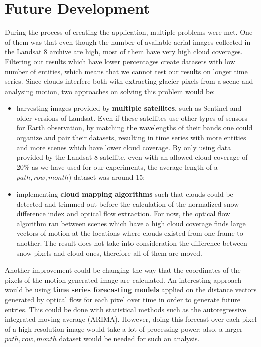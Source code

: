 \documentclass[12pt, a4paper]{report}
\begin{document}
	\section{Future Development}
	\label{seq:future_development}
	
	\par During the process of creating the application, multiple problems were met. One of them was that even though the number of available aerial images collected in the Landsat 8 archive are high, most of them have very high cloud coverages. Filtering out results which have lower percentages create datasets with low number of entities, which means that we cannot test our results on longer time series. Since clouds interfere both with extracting glacier pixels from a scene and analysing motion, two approaches on solving this problem would be:
	
	\begin{itemize}
		\item harvesting images provided by \textbf{multiple satellites}, such as Sentinel and older versions of Landsat. Even if these satellites use other types of sensors for Earth observation, by matching the wavelengths of their bands one could organize and pair their datasets, resulting in time series with more entities and more scenes which have lower cloud coverage. By only using data provided by the Landsat 8 satellite, even with an allowed cloud coverage of 20\% as we have used for our experiments, the average length of a \(path, row, month\)) dataset was around 15;
		\item implementing \textbf{cloud mapping algorithms} such that clouds could be detected and trimmed out before the calculation of the normalized snow difference index and optical flow extraction. For now, the optical flow algorithm ran between scenes which have a high cloud coverage finds large vectors of motion at the locations where clouds existed from one frame to another. The result does not take into consideration the difference between snow pixels and cloud ones, therefore all of them are moved. 
	\end{itemize}
	
	\par Another improvement could be changing the way that the coordinates of the pixels of the motion generated image are calculated. An interesting approach would be using \textbf{time series forecasting models} applied on the distance vectors generated by optical flow for each pixel over time in order to generate future entries. This could be done with statistical methods such as the autoregressive integrated moving average (ARIMA). However, doing this forecast over each pixel of a high resolution image would take a lot of processing power; also, a larger \(path, row, month\) dataset would be needed for such an analysis.
	
\end{document}
